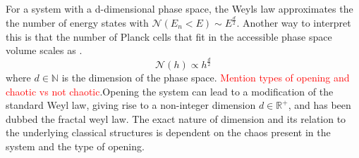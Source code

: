 \documentclass{iopart}
\begin{document}
For a system with a d-dimensional phase space, the Weyls law approximates the the number of energy states with $\mathcal{N}(E_n<E)\sim E^{\frac{d}{2}}$. Another way to interpret this is that the number of Planck cells that fit in the accessible phase space volume scales as \cite{Henning_2010_frac_weyl,Henning_2013_scattering_PT_Review}. 
\begin{equation}
	\mathcal{N}(h)\propto h^\frac{d}{2}
\end{equation}
where $d\in\mathbb{N}$ is the dimension of the phase space. \textcolor{red}{Mention types of opening and chaotic vs not chaotic}.Opening the system can lead to a modification of the standard Weyl law, giving rise to a non-integer dimension $d\in\mathbb{R^{+}}$, and has been dubbed the fractal weyl law.  The exact nature of dimension and its relation to the underlying classical structures is dependent on the chaos present in the system and the type of opening. 

%
%
%
\end{document}
